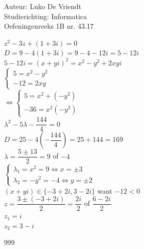 \documentclass[a4paper]{article}
\begin{document}
\noindent \large Auteur: Luko De Vriendt\\
\noindent \large Studierichting: Informatica\\
\noindent \large Oefeningenreeks 1B nr. 43.17\\

\medskip

\normalsize

$z^2 -3z +(1 +3i) = 0$ \\

$D = 9 -4(1 +3i) = 9 -4 -12i = 5 -12i$ \\

$5 -12i = (x+yi)^2 = x^2 -y^2 +2xyi$ \\

$\left \{
\begin{array}{l}
5 = x^2 -y^2 \\
-12 = 2xy
\end{array}
\right .$ \\

$\Leftrightarrow \left \{
\begin{array}{l}
5 = x^2 + (-y^2) \\
-36 = x^2(-y^2)
\end{array}
\right .$ \\

$\lambda^2 -5\lambda -\dfrac{144}{4} = 0$ \\

$D = 25 -4\left(-\dfrac{144}{4}\right) = 25 + 144 = 169$ \\

$\lambda = \dfrac{5 \pm 13}{2} = 9$ of $-4$ \\

$\left \{
\begin{array}{l}
\lambda_1 = x^2 = 9 \Leftrightarrow x = \pm 3 \\
\lambda_2 = -y^2 = -4 \Leftrightarrow y = \pm 2
\end{array}
\right .$ \\

$(x+yi) \in \{-3+2i, 3-2i\}$ want $-12 < 0$ \\

$z = \dfrac{3 \pm (-3+2i)}{2} = \dfrac{2i}{2}$ of $\dfrac{6 -2i}{2}$ \\

$z_1 = i$ \\

$z_2 = 3 -i$ \\


\begin{thebibliography}{999}
\end{thebibliography}
\end{document}
